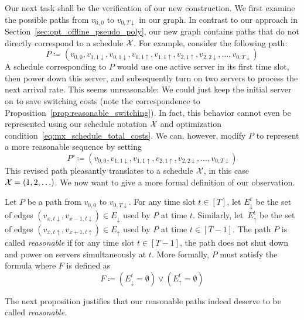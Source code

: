 Our next task shall be the verification of our new construction. We first examine the possible paths from $v_{0,0}$ to $v_{0,T\downarrow}$ in our graph.
In contrast to our approach in Section~\ref{sec:opt_offline_pseudo_poly}, our new graph contains paths that do not directly correspond to a schedule $\mathcal{X}$. For example, consider the following path:
\begin{equation*}
	P\coloneqq(v_{0,0},v_{1,1\downarrow},v_{0,1\downarrow},v_{0,1\uparrow},v_{1,1\uparrow},v_{2,1\uparrow},v_{2,2\downarrow},\dotsc,v_{0,T\downarrow})
\end{equation*}
A schedule corresponding to $P$ would use one active server in its first time slot, then power down this server, and subsequently turn on two servers to process the next arrival rate. This seems unreasonable: We could just keep the initial server on to save switching costs (note the correspondence to Proposition~\ref{prop:reasonable_switching}). In fact, this behavior cannot even be represented using our schedule notation $\mathcal{X}$ and optimization condition~\eqref{eq:mx_schedule_total_costs}. We can, however, modify $P$ to represent a more reasonable sequence by setting
\begin{equation*}
	P'\coloneqq(v_{0,0},v_{1,1\downarrow},v_{1,1\uparrow},v_{2,1\uparrow},v_{2,2\downarrow},\dotsc,v_{0,T\downarrow})
\end{equation*}
This revised path pleasantly translates to a schedule $\mathcal{X}$, in this case $\mathcal{X}=(1,2,\ldots)$. We now want to give a more formal definition of our observation.
\begin{defn}\label{defn_reasn_paths}
Let $P$ be a path from $v_{0,0}$ to $v_{0,T\downarrow}$. For any time slot $t\in[T]$, let $E_\downarrow^t$ be the set of edges $(v_{x,t\downarrow},v_{x-1,t\downarrow})\in E_\downarrow$ used by $P$ at time $t$. Similarly, let~$E_\uparrow^t$ be the set of edges $(v_{x,t\uparrow},v_{x+1,t\uparrow})\in E_\uparrow$ used by $P$ at time $t\in[T-1]$.
The path $P$ is called \emph{reasonable} if for any time slot $t\in[T-1]$, the path does not shut down and power on servers simultaneously at $t$. More formally, $P$ must satisfy the formula  where $F$ is defined as
\begin{equation}
	F\coloneqq\left(E_\downarrow^t=\emptyset\right)\lor\left(E_\uparrow^t=\emptyset\right)\label{eq:reasn_path}
\end{equation}
\end{defn}
The next proposition justifies that our reasonable paths indeed deserve to be called \textit{reasonable}.
